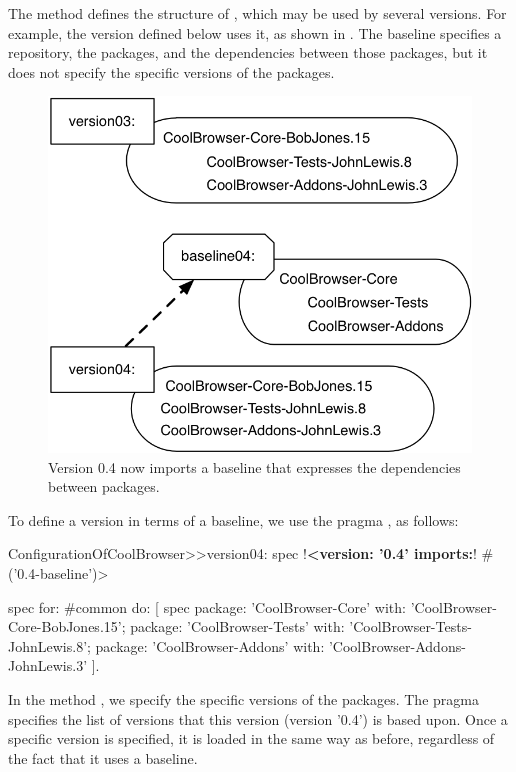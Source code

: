 \documentclass[a4paper,10pt,twoside]{book}
\begin{document}
The method  defines the structure of ,
which may be used by several versions. For example, the version  defined below uses it, as shown in .  The baseline specifies a repository, the packages, and the  dependencies between those packages, but it does not specify the specific versions of the packages.  

\begin{figure}
\begin{center}
\includegraphics[width=0.6\linewidth]{version04}
\caption{Version 0.4 now imports a baseline that expresses the dependencies between packages.\label{fig:version04}}
\end{center}
\end{figure} 

To define a version in terms of a baseline, we use the pragma \mbox{}, as follows:

\begin{code}{}
ConfigurationOfCoolBrowser>>version04: spec 
      !\textbf{<version: '0.4' imports:}! #('0.4-baseline')>
       
      spec for: #common do: [
             spec 
                   package: 'CoolBrowser-Core' with: 'CoolBrowser-Core-BobJones.15';
                   package: 'CoolBrowser-Tests' with: 'CoolBrowser-Tests-JohnLewis.8';
                   package: 'CoolBrowser-Addons' with: 'CoolBrowser-Addons-JohnLewis.3' ].
\end{code}

In the method , we specify the specific versions of the packages. The pragma  specifies the list of versions that this version (version '0.4') is based upon. Once a specific version is specified, it is loaded in the same way as before, regardless of the fact that it uses a baseline.
\end{document}
